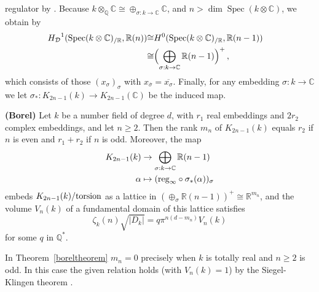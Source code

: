 \documentclass{amsart}
\begin{document}
regulator by \cite[Theorem~10.9]{Bur02}.
Because $ k{\otimes}_{\mathbb Q}{\mathbb C} {\cong} \oplus_{{\sigma}: k \to {\mathbb C}} {\mathbb C} $,
and $ n > \dim {\operatorname{Spec}}(k\otimes {\mathbb C}) $, we obtain by \cite[p.9]{schn88}
\begin{equation}\label{HDid}
\begin{aligned}
   {H_{\mathcal D}}^1({\operatorname{Spec}}(k\otimes {\mathbb C})_{/{\mathbb R}},{\mathbb R}(n))
& {\cong}
   H^0({\operatorname{Spec}}(k\otimes {\mathbb C})_{/{\mathbb R}},{\mathbb R}(n-1))
\cr
& {\cong}
   \Bigl(\bigoplus_{{\sigma}: k\to {\mathbb C}} {\mathbb R}(n-1)\Bigr)^+
\,,
\end{aligned}
\end{equation}
which consists of those $ (x_{\sigma})_{\sigma} $ with $ x_{\overline{\sigma}} = \overline{x_{\sigma}} $.
Finally, for any embedding $ {\sigma} : k \to {\mathbb C} $ we let $ {\sigma}_* : K_{2n-1}(k) \to K_{2n-1}({\mathbb C}) $ be the induced map.

\begin{theorem}\label{boreltheorem}{\bf (Borel)}
Let $ k $ be a number field of degree $ d $, with $ r_1 $ real embeddings and $ 2 r_2 $ complex embeddings, and let $ n \ge 2 $.
Then the rank $ m_n $ of $ K_{2n-1}(k) $ equals $ r_2 $ if $ n $ is even and $ r_1+r_2 $ if $ n $ is odd.
Moreover, the map
\begin{equation}\label{Bregulator}
\begin{aligned}
 K_{2n-1}(k) & \to \bigoplus_{{\sigma} : k \to {\mathbb C} } {\mathbb R}(n-1)
\\
{\alpha} & \mapsto ({\textup{reg}}_\infty\circ{\sigma}_*({\alpha}))_{\sigma}
\end{aligned}
\end{equation}
embeds $ K_{2n-1}(k)/{\textup{torsion}} $ as a lattice in
$ (\oplus_{\sigma} {\mathbb R}(n-1))^+ {\cong} {\mathbb R}^{m_n} $,
and the volume $ V_n(k) $ of a fundamental domain of this lattice satisfies
\begin{equation}\label{borelq}
 \zeta_k(n)  \sqrt{|D_k|} = q \pi^{n(d-m_n)} V_n(k) 
\end{equation} 
for some $ q $ in $ {\mathbb Q}^* $.
\end{theorem}

\begin{remark}\label{klingensiegelremark}
In Theorem~\ref{boreltheorem} $ m_n = 0 $ precisely when $ k $ is totally real and $ n \ge 2 $
is odd.  In this case the given relation holds (with $ V_n(k) = 1 $)
by the Siegel-Klingen theorem \cite[Chapter~VII, Corollary~9.9]{Neu99}.
\end{remark}
\end{document}
